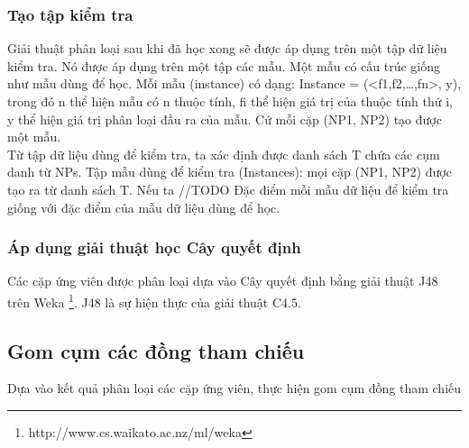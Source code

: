 \documentclass[12pt]{extarticle}
\begin{document}
			\subsubsection*{Tạo tập kiểm tra}
				\par Giải thuật phân loại sau khi đã học xong sẽ được áp dụng trên một tập dữ liệu kiểm tra. Nó được áp dụng trên một tập các mẫu. Một mẫu có cấu trúc giống như mẫu dùng để học. Mỗi mẫu (instance) có dạng: Instance = (<f1,f2,…,fn>, y), trong đó n thể hiện mẫu có n thuộc tính, fi thể hiện giá trị của thuộc tính thứ i, y thể hiện giá trị phân loại đầu ra của mẫu. Cứ mỗi cặp (NP1, NP2) tạo được một mẫu. 
				\\Từ tập dữ liệu dùng để kiểm tra, ta xác định được danh sách T chứa các cụm danh từ NPs. Tập mẫu dùng để kiểm tra (Instances): mọi cặp (NP1, NP2) được tạo ra từ danh sách T. Nếu ta //TODO
				Đặc điểm mỗi mẫu dữ liệu để kiểm tra giống với đặc điểm của mẫu dữ liệu dùng để học.

			\subsubsection*{Áp dụng giải thuật học Cây quyết định}
				\par Các cặp ứng viên được phân loại dựa vào Cây quyết định bằng giải thuật J48 trên Weka \footnote{http://www.cs.waikato.ac.nz/ml/weka}. J48 là sự hiện thực của giải thuật C4.5.
		\subsection{Gom cụm các đồng tham chiếu}	
			\par Dựa vào kết quả phân loại các cặp ứng viên, thực hiện gom cụm đồng tham chiếu
\end{document}

